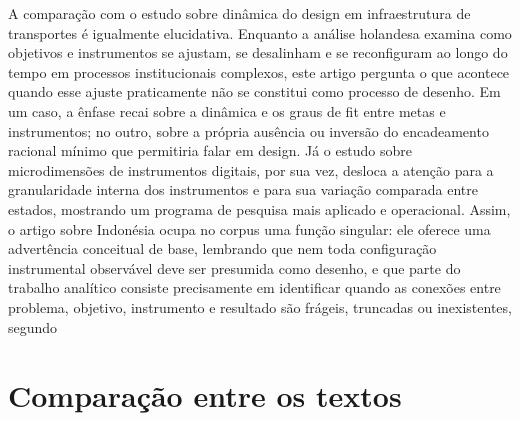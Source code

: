 \documentclass[12pt,a4paper]{article}
\begin{document}
A comparação com o estudo sobre dinâmica do design em infraestrutura de transportes é igualmente elucidativa. Enquanto a análise holandesa examina como objetivos e instrumentos se ajustam, se desalinham e se reconfiguram ao longo do tempo em processos institucionais complexos, este artigo pergunta o que acontece quando esse ajuste praticamente não se constitui como processo de desenho. Em um caso, a ênfase recai sobre a dinâmica e os graus de fit entre metas e instrumentos; no outro, sobre a própria ausência ou inversão do encadeamento racional mínimo que permitiria falar em design. Já o estudo sobre microdimensões de instrumentos digitais, por sua vez, desloca a atenção para a granularidade interna dos instrumentos e para sua variação comparada entre estados, mostrando um programa de pesquisa mais aplicado e operacional. Assim, o artigo sobre Indonésia ocupa no corpus uma função singular: ele oferece uma advertência conceitual de base, lembrando que nem toda configuração instrumental observável deve ser presumida como desenho, e que parte do trabalho analítico consiste precisamente em identificar quando as conexões entre problema, objetivo, instrumento e resultado são frágeis, truncadas ou inexistentes, segundo\parencite{geet2019_policy_design,lui2026_micro_dimensions,newman2020_policy_design}



\section{Comparação entre os textos}
\label{sec:orge6ef0de}
\end{document}
